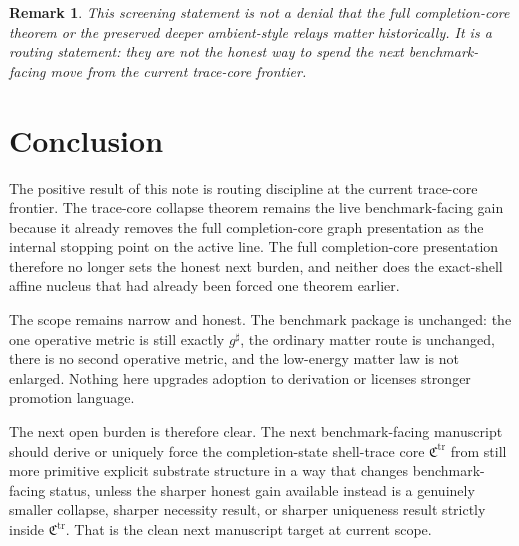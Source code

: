 \documentclass[11pt]{article}
\newcommand{\CompletedMetric}{g^{\sharp}}
\newcommand{\TraceCore}{\mathfrak C^{\mathrm{tr}}}
\newtheorem{remark}{Remark}
\begin{document}
\begin{remark}
This screening statement is not a denial that the full completion-core theorem or the preserved deeper ambient-style relays matter historically. It is a routing statement: they are not the honest way to spend the next benchmark-facing move from the current trace-core frontier.
\end{remark}

\section{Conclusion}

The positive result of this note is routing discipline at the current trace-core frontier. The trace-core collapse theorem remains the live benchmark-facing gain because it already removes the full completion-core graph presentation as the internal stopping point on the active line. The full completion-core presentation therefore no longer sets the honest next burden, and neither does the exact-shell affine nucleus that had already been forced one theorem earlier.

The scope remains narrow and honest. The benchmark package is unchanged: the one operative metric is still exactly \(\CompletedMetric\), the ordinary matter route is unchanged, there is no second operative metric, and the low-energy matter law is not enlarged. Nothing here upgrades adoption to derivation or licenses stronger promotion language.

The next open burden is therefore clear. The next benchmark-facing manuscript should derive or uniquely force the completion-state shell-trace core \(\TraceCore\) from still more primitive explicit substrate structure in a way that changes benchmark-facing status, unless the sharper honest gain available instead is a genuinely smaller collapse, sharper necessity result, or sharper uniqueness result strictly inside \(\TraceCore\). That is the clean next manuscript target at current scope.
\end{document}
